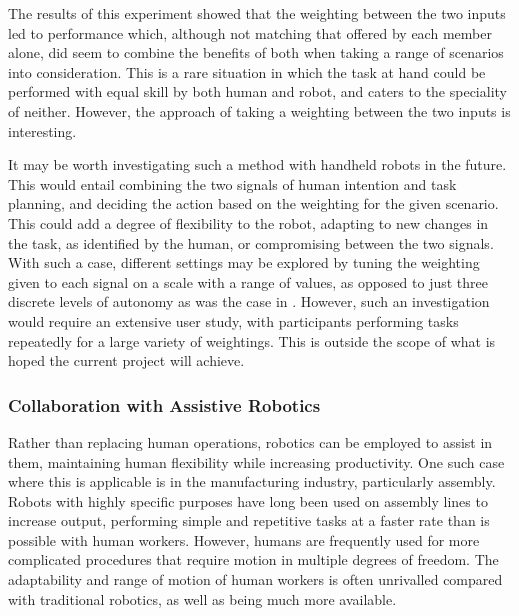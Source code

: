 \documentclass[11pt]{article}
\begin{document}
The results of this experiment showed that the weighting between the two inputs led to performance which, although not matching that offered by each member alone, did seem to combine the benefits of both when taking a range of scenarios into consideration. This is a rare situation in which the task at hand could be performed with equal skill by both human and robot, and caters to the speciality of neither. However, the approach of taking a weighting between the two inputs is interesting. 

It may be worth investigating such a method with handheld robots in the future. This would entail combining the two signals of human intention and task planning, and deciding the action based on the weighting for the given scenario. This could add a degree of flexibility to the robot, adapting to new changes in the task, as identified by the human, or compromising between the two signals. With such a case, different settings may be explored by tuning the weighting given to each signal on a scale with a range of values, as opposed to just three discrete levels of autonomy as was the case in \cite{GreggSmithDesign}. However, such an investigation would require an extensive user study, with participants performing tasks repeatedly for a large variety of weightings. This is outside the scope of what is hoped the current project will achieve.

\subsubsection{Collaboration with Assistive Robotics}
Rather than replacing human operations, robotics can be employed to assist in them, maintaining human flexibility while increasing productivity. One such case where this is applicable is in the manufacturing industry, particularly assembly. Robots with highly specific purposes have long been used on assembly lines to increase output, performing simple and repetitive tasks at a faster rate than is possible with human workers. However, humans are frequently used for more complicated procedures that require motion in multiple degrees of freedom. The adaptability and range of motion of human workers is often unrivalled compared with traditional robotics, as well as being much more available. 
\end{document}
